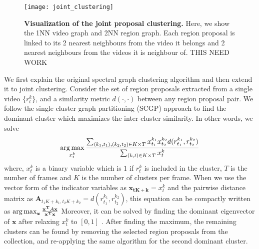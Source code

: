 \begin{figure}[ht]
  \texttt{[image: joint\_clustering]}
  
  \caption{\textbf{Visualization of the joint proposal clustering.} Here, we show the 1NN video graph and 2NN region graph. Each region proposal is linked to its 2 nearest neighbours from the video it belongs and 2 nearest neighbours from the videos it is neighbour of. THIS NEED WORK}
  \label{hierProposal}
\end{figure}

We first explain the original spectral graph clustering algorithm and then extend it to joint clustering. Consider the set of region proposals extracted from a single video $\{r^k_t\}$, and a similarity metric $d(\cdot,\cdot)$ between any region proposal pair. We follow the single cluster graph partitioning (SCGP)\cite{scgp} approach to find the dominant cluster which maximizes the inter-cluster similarity. In other words, we solve
\begin{equation}
  \operatorname*{arg\,max}_{x^k_t} \frac{\sum_{(k_1,t_1),(k_2,t_2) \in K \times T} x^{k_1}_{t_1} x^{k_2}_{t_2} d(r^{k_1}_{t_1},r^{k_2}_{t_2})}{\sum_{(k,t) \in K \times T} x^{k}_t}
\end{equation}
where, $x^{k}_t$ is a binary variable which is $1$ if $r^{k}_t$ is included in the cluster, $T$ is the number of frames and $K$ is the number of clusters per frame. When we use the vector form of the indicator variables as $\mathbf{x_{tK+k}}=x^{k}_{t}$ and the pairwise distance matrix as $\mathbf{A}_{t_1K+k_1,t_2K+k_2}=d(r^{k_1}_{t_1},r^{k_2}_{t_2})$, this equation can be compactly written as
$\operatorname*{arg\,max}_{\mathbf{x}} \frac{\mathbf{x^T}A\mathbf{x}}{\mathbf{x^T}\mathbf{x}}$
Moreover, it can be solved by finding the dominant eigenvector of $\mathbf{x}$ after relaxing $x^{k}_t$ to $[0,1]$ \cite{scgp,scgp_eigen}. After finding the maximum, the remaining clusters can be found by removing the selected region proposals from the collection, and re-applying the same algorithm for the second dominant cluster.


